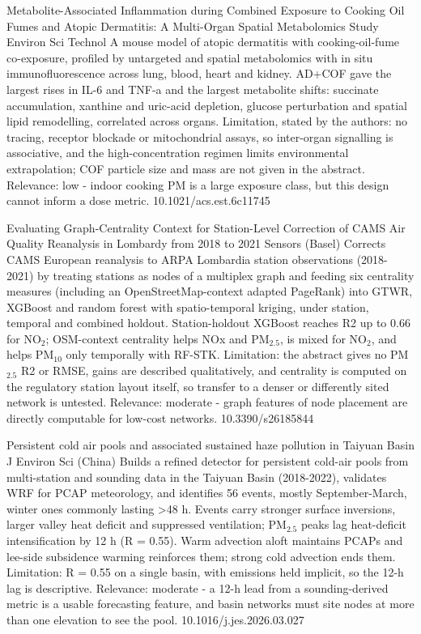\documentclass[10pt]{article}
\begin{document}
{Metabolite-Associated Inflammation during Combined Exposure to Cooking Oil Fumes and Atopic Dermatitis: A Multi-Organ Spatial Metabolomics Study}
{Environ Sci Technol}
{A mouse model of atopic dermatitis with cooking-oil-fume co-exposure, profiled by untargeted and spatial metabolomics with in situ immunofluorescence across lung, blood, heart and kidney. AD+COF gave the largest rises in IL-6 and TNF-a and the largest metabolite shifts: succinate accumulation, xanthine and uric-acid depletion, glucose perturbation and spatial lipid remodelling, correlated across organs. Limitation, stated by the authors: no tracing, receptor blockade or mitochondrial assays, so inter-organ signalling is associative, and the high-concentration regimen limits environmental extrapolation; COF particle size and mass are not given in the abstract. Relevance: low - indoor cooking PM is a large exposure class, but this design cannot inform a dose metric.}
{10.1021/acs.est.6c11745}

\par{}\baselineskip{}\baselineskip
{}

{Evaluating Graph-Centrality Context for Station-Level Correction of CAMS Air Quality Reanalysis in Lombardy from 2018 to 2021}
{Sensors (Basel)}
{Corrects CAMS European reanalysis to ARPA Lombardia station observations (2018-2021) by treating stations as nodes of a multiplex graph and feeding six centrality measures (including an OpenStreetMap-context adapted PageRank) into GTWR, XGBoost and random forest with spatio-temporal kriging, under station, temporal and combined holdout. Station-holdout XGBoost reaches R2 up to 0.66 for NO$_2$; OSM-context centrality helps NOx and PM$_{2.5}$, is mixed for NO$_2$, and helps PM$_{10}$ only temporally with RF-STK. Limitation: the abstract gives no PM$_{2.5}$ R2 or RMSE, gains are described qualitatively, and centrality is computed on the regulatory station layout itself, so transfer to a denser or differently sited network is untested. Relevance: moderate - graph features of node placement are directly computable for low-cost networks.}
{10.3390/s26185844}

{Persistent cold air pools and associated sustained haze pollution in Taiyuan Basin}
{J Environ Sci (China)}
{Builds a refined detector for persistent cold-air pools from multi-station and sounding data in the Taiyuan Basin (2018-2022), validates WRF for PCAP meteorology, and identifies 56 events, mostly September-March, winter ones commonly lasting >48 h. Events carry stronger surface inversions, larger valley heat deficit and suppressed ventilation; PM$_{2.5}$ peaks lag heat-deficit intensification by 12 h (R = 0.55). Warm advection aloft maintains PCAPs and lee-side subsidence warming reinforces them; strong cold advection ends them. Limitation: R = 0.55 on a single basin, with emissions held implicit, so the 12-h lag is descriptive. Relevance: moderate - a 12-h lead from a sounding-derived metric is a usable forecasting feature, and basin networks must site nodes at more than one elevation to see the pool.}
{10.1016/j.jes.2026.03.027}
\end{document}
